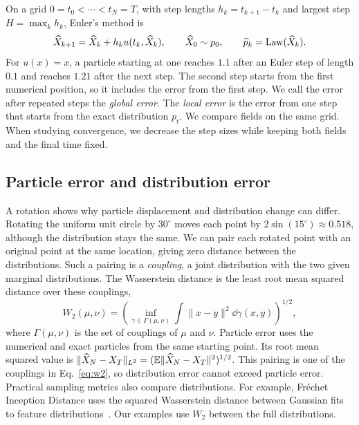 On a grid $0=t_0<\cdots<t_N=T$, with step lengths $h_k=t_{k+1}-t_k$ and largest step $H=\max_kh_k$, Euler's method is
\begin{equation}
 \widehat X_{k+1}=\widehat X_k+h_ku(t_k,\widehat X_k),
 \qquad \widehat X_0\sim p_0,\qquad
 \widehat p_k=\operatorname{Law}(\widehat X_k).
 \label{eq:euler}
\end{equation}
For $u(x)=x$, a particle starting at one reaches $1.1$ after an Euler step of length $0.1$ and reaches $1.21$ after the next step. The second step starts from the first numerical position, so it includes the error from the first step. We call the error after repeated steps the \emph{global error}. The \emph{local error} is the error from one step that starts from the exact distribution $p_t$. We compare fields on the same grid. When studying convergence, we decrease the step sizes while keeping both fields and the final time fixed.

\subsection{Particle error and distribution error}
\label{sec:errors}

A rotation shows why particle displacement and distribution change can differ. Rotating the uniform unit circle by $30^\circ$ moves each point by $2\sin(15^\circ)\approx0.518$, although the distribution stays the same. We can pair each rotated point with an original point at the same location, giving zero distance between the distributions. Such a pairing is a \emph{coupling}, a joint distribution with the two given marginal distributions. The Wasserstein distance is the least root mean squared distance over these couplings,
\begin{equation}
 W_2(\mu,\nu)=
 \left(\inf_{\gamma\in\Gamma(\mu,\nu)}
 \int\|x-y\|^2\dd\gamma(x,y)\right)^{1/2},
 \label{eq:w2}
\end{equation}
where $\Gamma(\mu,\nu)$ is the set of couplings of $\mu$ and $\nu$. Particle error uses the numerical and exact particles from the same starting point. Its root mean squared value is $\|\widehat X_N-X_T\|_{L^2}=(\mathbb E\|\widehat X_N-X_T\|^2)^{1/2}$. This pairing is one of the couplings in Eq.~\eqref{eq:w2}, so distribution error cannot exceed particle error. Practical sampling metrics also compare distributions. For example, Fr\'echet Inception Distance uses the squared Wasserstein distance between Gaussian fits to feature distributions~\citep{heusel2017gans}. Our examples use $W_2$ between the full distributions.

